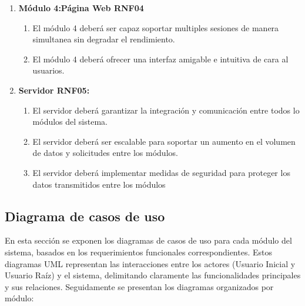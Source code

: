 \begin{enumerate}
    \item \label{it:RNF04} \textbf{Módulo 4:Página Web RNF04}
                \begin{enumerate}
                        \item El módulo 4 deberá ser capaz soportar multiples sesiones de manera simultanea sin degradar el rendimiento.
                        \item El módulo 4 deberá ofrecer una interfaz amigable e intuitiva de cara al usuarios.
                \end{enumerate}

    \item \label{it:RNF04} \textbf{Servidor RNF05:}
             \begin{enumerate}
                    \item El servidor deberá garantizar la integración y comunicación entre todos lo módulos del sistema.
                    \item El servidor deberá ser escalable para soportar un aumento en el volumen de datos y solicitudes entre los módulos.
                    \item El servidor deberá implementar medidas de seguridad para proteger los datos transmitidos entre los módulos
            \end{enumerate}

            
    \end{enumerate}

\subsection{Diagrama de casos de uso}


En esta sección se exponen los diagramas de casos de uso para cada módulo del sistema, 
basados en los requerimientos funcionales correspondientes. Estos diagramas 
UML representan las interacciones entre los actores (Usuario Inicial y Usuario Raíz) 
y el sistema, delimitando claramente las funcionalidades principales y sus relaciones.
Seguidamente se presentan los diagramas organizados por módulo:


